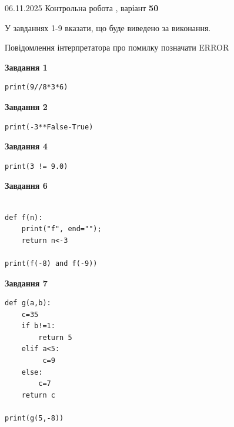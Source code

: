 \documentclass[12pt, ukrainian]{article}
\begin{document}
{\Large{06.11.2025 Контрольна робота , варіант  \No \textbf { 50 }\par}}
{
\begin {large}
У завданнях 1-9 вказати, що буде виведено за виконання.

Повідомлення інтерпретатора про помилку позначати ERROR

\begin{minipage}[t]{7.5cm}

\begin{center}
\textbf{Завдання 1}
\end{center}

\begin{verbatim}
print(9//8*3*6)
\end{verbatim}



\begin{center}
\textbf{Завдання 2}
\end{center}

\begin{verbatim}
print(-3**False-True)
\end{verbatim}



\begin{center}
\textbf{Завдання 4}
\end{center}

\begin{verbatim}
print(3 != 9.0)
\end{verbatim}



\begin{center}
\textbf{Завдання 6}
\end{center}

\begin{verbatim}

def f(n):
    print("f", end="");
    return n<-3

print(f(-8) and f(-9))
\end{verbatim}



\begin{center}
\textbf{Завдання 7}
\end{center}

\begin{verbatim}
def g(a,b):
    c=35
    if b!=1:
        return 5
    elif a<5:
         c=9
    else: 
        c=7
    return c

print(g(5,-8))
\end{verbatim}


\end{minipage}
\end{large}}
\end{document}
